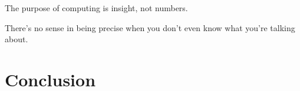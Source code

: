 \begin{savequote}[0.55\linewidth]
	\begin{fancyquote}
		The purpose of computing is insight, not numbers.
	\end{fancyquote}
	\begin{fancyquote}
		There's no sense in being precise when you don't even know what
		you're talking about.
	\end{fancyquote}
\end{savequote}
\chapter{Conclusion}\label{ch:conclusion}
